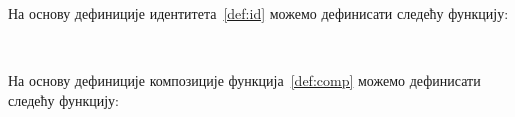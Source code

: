 На основу дефиниције идентитета~\ref{def:id} можемо дефинисати следећу функцију: 
\begin{code}%
\>[0]\AgdaSpace{}%
\AgdaSymbol{:}\AgdaSpace{}%
\AgdaSymbol{\{}\AgdaSpace{}%
\AgdaSymbol{:}\AgdaSpace{}%
\AgdaSpace{}%
\AgdaSpace{}%
\AgdaSymbol{\}}\AgdaSpace{}%
\AgdaSpace{}%
\AgdaSpace{}%
\AgdaSpace{}%
\<%
\\
\>[0]\AgdaSpace{}%
\AgdaSpace{}%
\AgdaSymbol{=}\AgdaSpace{}%
\<%
\end{code}

На основу дефиниције композиције функција~\ref{def:comp} можемо дефинисати следећу функцију:

\begin{code}%
\>[0]%
\>[96I]\AgdaSymbol{:}\AgdaSpace{}%
\AgdaSymbol{\{}\AgdaSpace{}%
\AgdaSymbol{:}\AgdaSpace{}%
\AgdaSpace{}%
\AgdaSpace{}%
\AgdaSymbol{\}}\AgdaSpace{}%
\AgdaSymbol{\{}\AgdaSpace{}%
\AgdaSymbol{:}\AgdaSpace{}%
\AgdaSpace{}%
\AgdaSpace{}%
\AgdaSymbol{\}}\AgdaSpace{}%
\AgdaSymbol{\{}\AgdaSpace{}%
\AgdaSymbol{:}\AgdaSpace{}%
\AgdaSpace{}%
\AgdaSpace{}%
\AgdaSpace{}%
\AgdaSpace{}%
\AgdaSymbol{\}}\<%
\\
\>[.][@{}l@{}]\<[96I]%
\>[4]\AgdaSpace{}%
\AgdaSymbol{(}\AgdaSpace{}%
\AgdaSymbol{:}\AgdaSpace{}%
\AgdaSymbol{(}\AgdaSpace{}%
\AgdaSymbol{:}\AgdaSpace{}%
\AgdaSymbol{)}\AgdaSpace{}%
\AgdaSpace{}%
\AgdaSpace{}%
\AgdaSymbol{)}\<%
\\
%
\>[4]\AgdaSpace{}%
\AgdaSymbol{(}\AgdaSpace{}%
\AgdaSymbol{:}\AgdaSpace{}%
\AgdaSpace{}%
\AgdaSpace{}%
\AgdaSymbol{)}\<%
\\
%
\>[4]\AgdaSpace{}%
\AgdaSymbol{(}\AgdaSpace{}%
\AgdaSymbol{:}\AgdaSpace{}%
\AgdaSymbol{)}\AgdaSpace{}%
\AgdaSpace{}%
\AgdaSpace{}%
\AgdaSymbol{(}\AgdaSpace{}%
\AgdaSymbol{)}\<%
\\
\>[0]\AgdaSymbol{(}\AgdaSpace{}%
\AgdaSpace{}%
\AgdaSymbol{)}\AgdaSpace{}%
\AgdaSpace{}%
\AgdaSymbol{=}\AgdaSpace{}%
\AgdaSpace{}%
\AgdaSymbol{(}\AgdaSpace{}%
\AgdaSymbol{)}\<%
\end{code}


